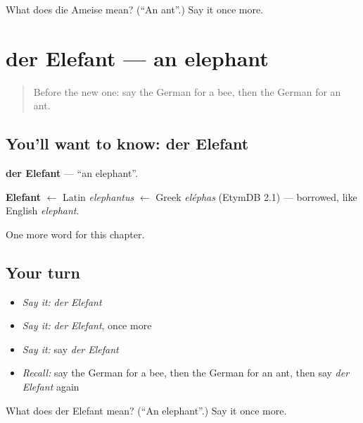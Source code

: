 \begin{tcolorbox}[breakable,colback=teal!4,colframe=teal!35!black,title={Before you move on}]
What does die Ameise mean? (\textquotedblleft{}An ant\textquotedblright{}.) Say it once more.
\end{tcolorbox}
\section[der Elefant]{der Elefant — an elephant}

\label{lesson:GE-C88-elefant}



\begin{quote}
Before the new one: say the German for a bee, then the German for an ant.
\end{quote}

\subsection*{You'll want to know: der Elefant}
\textbf{der Elefant} — \textquotedblleft{}an elephant\textquotedblright{}.

\begin{cousinweb}
\textbf{Elefant} $\leftarrow$ Latin \emph{elephantus} $\leftarrow$ Greek \emph{eléphas} (EtymDB 2.1) — borrowed, like English \emph{elephant}.
\end{cousinweb}

\begin{grammarlens}[title={What you've built}]
One more word for this chapter.
\end{grammarlens}

\subsection*{Your turn}
\begin{itemize}
\raggedright
  \item \emph{Say it:} \emph{der Elefant}
  \item \emph{Say it:} \emph{der Elefant}, once more
  \item \emph{Say it:} say \emph{der Elefant}
  \item \emph{Recall:} say the German for a bee, then the German for an ant, then say \emph{der Elefant} again
\end{itemize}

\begin{tcolorbox}[breakable,colback=teal!4,colframe=teal!35!black,title={Before you move on}]
What does der Elefant mean? (\textquotedblleft{}An elephant\textquotedblright{}.) Say it once more.
\end{tcolorbox}
